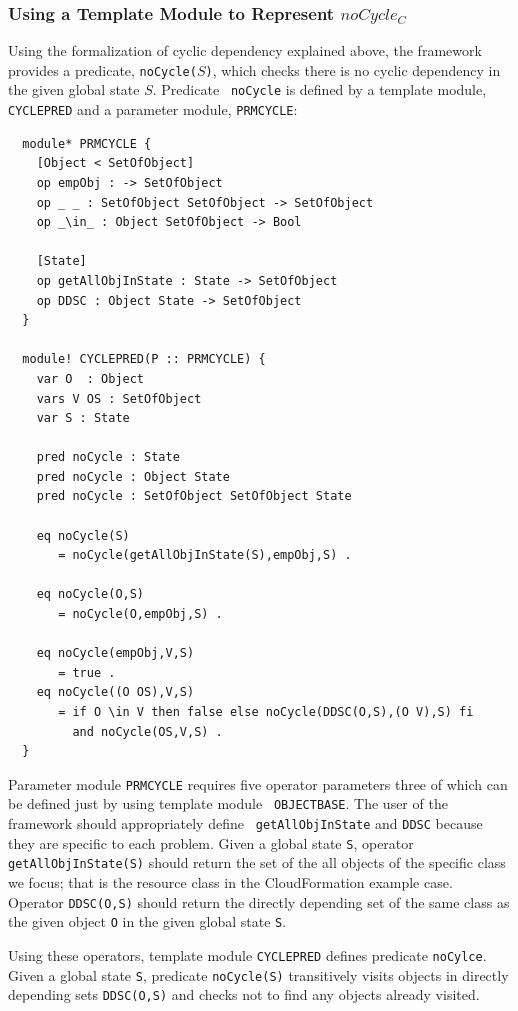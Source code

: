 \documentclass[12pt]{report}
\newcommand{\stt}[1]{{\small{\tt {#1}}}}
\begin{document}
\subsubsection{Using a Template Module to Represent $noCycle_C$}
Using the formalization of cyclic dependency explained above, the
framework provides a predicate, \stt{noCycle($S$)}, which checks there
is no cyclic dependency in the given global state $S$. Predicate {\tt
  noCycle} is defined by a template module, {\tt CYCLEPRED} and a
parameter module, {\tt PRMCYCLE}:
\small
\begin{verbatim}
  module* PRMCYCLE {
    [Object < SetOfObject]
    op empObj : -> SetOfObject
    op _ _ : SetOfObject SetOfObject -> SetOfObject
    op _\in_ : Object SetOfObject -> Bool
  
    [State]
    op getAllObjInState : State -> SetOfObject
    op DDSC : Object State -> SetOfObject
  }

  module! CYCLEPRED(P :: PRMCYCLE) {
    var O  : Object
    vars V OS : SetOfObject
    var S : State
  
    pred noCycle : State
    pred noCycle : Object State
    pred noCycle : SetOfObject SetOfObject State
  
    eq noCycle(S)
       = noCycle(getAllObjInState(S),empObj,S) .
  
    eq noCycle(O,S)
       = noCycle(O,empObj,S) .
  
    eq noCycle(empObj,V,S)
       = true .
    eq noCycle((O OS),V,S)
       = if O \in V then false else noCycle(DDSC(O,S),(O V),S) fi
         and noCycle(OS,V,S) .
  }
\end{verbatim}
\normalsize
Parameter module {\tt PRMCYCLE} requires five operator parameters
three of which can be defined just by using template module {\tt
  OBJECTBASE}.
The user of the framework should appropriately define {\tt
  getAllObjInState} and {\tt DDSC} because they are specific to each
problem. 
Given a global state {\tt S}, operator \stt{getAllObjInState(S)} should return
the set of the all objects of the specific class we focus; that is the
resource class in the CloudFormation example case. Operator
\stt{DDSC(O,S)} should return the directly depending set of the same class
as the given object {\tt O} in the given global state {\tt S}.

Using these operators, template module {\tt CYCLEPRED} defines predicate
{\tt noCylce}. Given
a global state {\tt S}, predicate \stt{noCycle(S)} transitively visits objects in
directly depending sets \stt{DDSC(O,S)} and checks not to find any
objects already visited.
\end{document}
